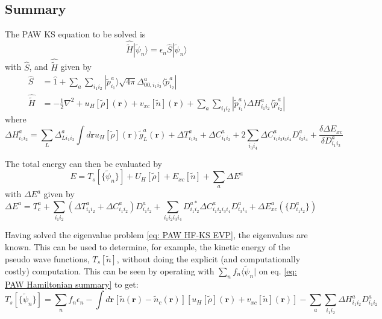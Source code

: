 \documentclass[a4paper]{article}
\newcommand{\s}[1]{\tilde{#1}}
\newcommand{\ws}[1]{\widetilde{#1}}
\newcommand{\h}[1]{\hat{#1}}
\newcommand{\wh}[1]{\widehat{#1}}
\newcommand{\br}{\mathbf{r}}
\newcommand{\bra}[1]{\langle #1 |}
\newcommand{\ket}[1]{| #1 \rangle}
\begin{document}
\subsection{Summary}\label{sec: summary exx hamiltonian}
The PAW KS equation to be solved is
%
\begin{equation}\label{eq: PAW HF-KS EVP}
  \wh{\ws{H}} \ket{\s{\psi}_n}= \epsilon_n \h{S} \ket{\s{\psi}_n}
\end{equation}
%
with $\h{S}$, and $\wh{\ws{H}}$ given by
%
\begin{subequations}
\begin{align}
\wh{S} &= \h{1} + \sum_a \sum_{i_1i_2} \ket{\s{p}_{i_1}^a}\sqrt{4\pi}\Delta^a_{00,i_1i_2}\bra{\s{p}_{i_2}^a}\\
\wh{\ws{H}} &= -\tfrac{1}{2}\nabla^2 + u_H[\s{\rho}](\br) + v_{xc}[\s{n}](\br) + \sum_a \sum_{i_1i_2} \ket{\s{p}^a_{i_1}} \Delta H^a_{i_1i_2} \bra{\s{p}^a_{i_2}}\label{eq: PAW Hamiltonian summary}
\end{align}
\end{subequations}
%
where
%
\begin{equation}
    \Delta H^a_{i_1i_2} = \sum_L \Delta^a_{Li_1i_2} \int d\br u_H[\s{\rho}](\br)\s{g}^a_L(\br) + \Delta T^a_{i_1i_2} + \Delta C^a_{i_1i_2} + 2\sum_{i_3i_4} \Delta C^a_{i_1i_2i_3i_4}D^a_{i_3i_4} + \frac{\delta \Delta E_{xc}}{\delta D^a_{i_1i_2}}
\end{equation}
%
\par The total energy can then be evaluated by
%
\begin{equation}
  E = T_s[\{\s{\psi}_n\}] + U_H[\s{\rho}] + E_{xc}[\s{n}] + \sum_a \Delta E^a  
\end{equation}
%
with $\Delta E^a$ given by
%
\begin{equation}
 \Delta E^a = T_c^a + \sum_{i_1i_2} \left( \Delta T^a_{i_1i_2} + \Delta C^a_{i_1i_2}\right) D_{i_1i_2}^a + \sum_{i_1i_2i_3i_4}D_{i_1i_2}^{a*} \Delta C_{i_1i_2i_3i_4}^a D_{i_3i_4}^a + \Delta E_{xc}^a(\{D_{i_1i_2}^a\})
\end{equation}
%
\par Having solved the eigenvalue problem \ref{eq: PAW HF-KS EVP},
the eigenvalues are known. This can be used to determine, for example,
the kinetic energy of the pseudo wave functions, $T_s[\s{n}]$, without
doing the explicit (and computationally costly) computation. This can
be seen by operating with $\sum_n f_n \bra{\s{\psi}_n}$ on eq.
\ref{eq: PAW Hamiltonian summary} to get:
%
\begin{equation}
  \label{eq:kinetic-energy}
  T_s[\{\s{\psi}_n\}] = \sum_n f_n \epsilon_n - \int d\br [\s{n}(\br) - \s{n}_c(\br)] \left[u_H[\s{\rho}](\br) + v_{xc}[\s{n}](\br)\right] - \sum_a \sum_{i_1i_2} \Delta H^a_{i_1i_2} D^a_{i_1i_2}
\end{equation}
\end{document}
